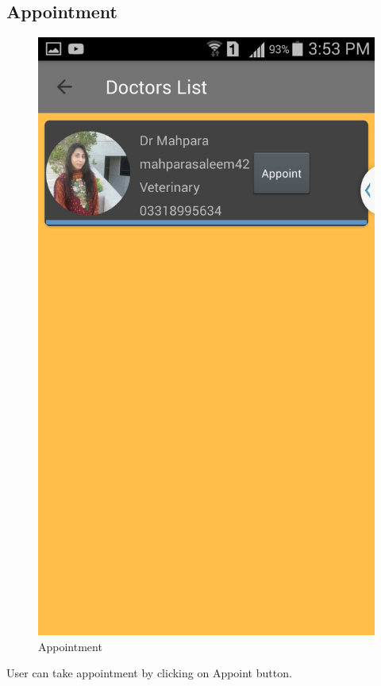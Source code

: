 \subsection{Appointment}
\begin{figure}[H] 
  \centering
    \includegraphics[scale=0.3]{88Appoint}
    \caption{Appointment}
\end{figure}

User can take appointment by clicking on Appoint button.
\newpage
